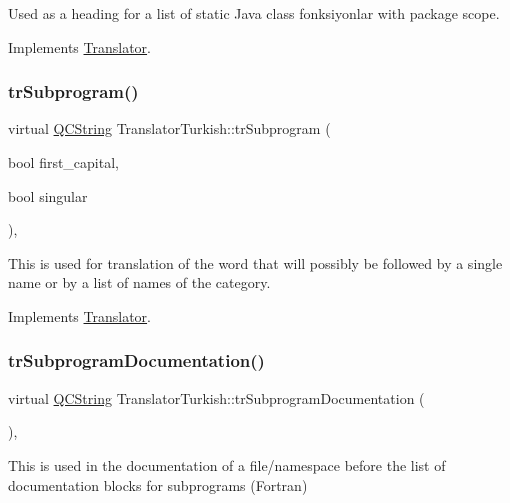 Used as a heading for a list of static Java class fonksiyonlar with package scope. 

Implements \mbox{\hyperlink{class_translator}{Translator}}.

\mbox{\label{class_translator_turkish_a8c30d270556d6e3e7fa53cf9eddd4572}} 
\subsubsection{\texorpdfstring{trSubprogram()}{trSubprogram()}}
{\footnotesize\ttfamily virtual \mbox{\hyperlink{class_q_c_string}{Q\+C\+String}} Translator\+Turkish\+::tr\+Subprogram (\begin{DoxyParamCaption}\item[{bool}]{first\+\_\+capital,  }\item[{bool}]{singular }\end{DoxyParamCaption})\hspace{0.3cm}{\ttfamily [inline]}, {\ttfamily [virtual]}}

This is used for translation of the word that will possibly be followed by a single name or by a list of names of the category. 

Implements \mbox{\hyperlink{class_translator}{Translator}}.

\mbox{\label{class_translator_turkish_a37148cf12ac57de63b5878529583b8ad}} 
\subsubsection{\texorpdfstring{trSubprogramDocumentation()}{trSubprogramDocumentation()}}
{\footnotesize\ttfamily virtual \mbox{\hyperlink{class_q_c_string}{Q\+C\+String}} Translator\+Turkish\+::tr\+Subprogram\+Documentation (\begin{DoxyParamCaption}{ }\end{DoxyParamCaption})\hspace{0.3cm}{\ttfamily [inline]}, {\ttfamily [virtual]}}

This is used in the documentation of a file/namespace before the list of documentation blocks for subprograms (Fortran) 

